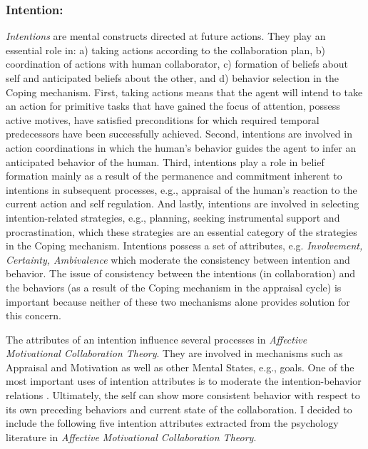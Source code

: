 \documentclass[letterpaper]{article}
\begin{document}
\subsubsection{Intention:}

\textit{Intentions} are mental constructs directed at future actions. They play
an essential role in: a) taking actions according to the collaboration plan, b)
coordination of actions with human collaborator, c) formation of beliefs about
self and anticipated beliefs about the other, and d) behavior selection in the
Coping mechanism. First, taking actions means that the agent will intend to take
an action for primitive tasks that have gained the focus of attention, possess
active motives, have satisfied preconditions for which required temporal
predecessors have been successfully achieved. Second, intentions are involved
in action coordinations in which the human's behavior guides the agent to infer
an anticipated behavior of the human. Third, intentions play a role in belief
formation mainly as a result of the permanence and commitment inherent to
intentions in subsequent processes, e.g., appraisal of the human's reaction to
the current action and self regulation. And lastly, intentions are involved in
selecting intention-related strategies, e.g., planning, seeking instrumental
support and procrastination, which these strategies are an essential category of
the strategies in the Coping mechanism. Intentions possess a set of attributes,
e.g. \textit{Involvement, Certainty, Ambivalence} which moderate the consistency
between intention and behavior. The issue of consistency between the intentions
(in collaboration) and the behaviors (as a result of the Coping mechanism in the
appraisal cycle) is important because neither of these two mechanisms alone
provides solution for this concern.

The attributes of an intention influence several processes in \textit{Affective
Motivational Collaboration Theory}. They are involved in mechanisms such as
Appraisal and Motivation as well as other Mental States, e.g., goals. One of the
most important uses of intention attributes is to moderate the
intention-behavior relations \cite{cooke:intention-behavior-consistency}.
Ultimately, the self can show more consistent behavior with respect to its own
preceding behaviors and current state of the collaboration. I decided to include
the following five intention attributes extracted from the psychology literature
in \textit{Affective Motivational Collaboration Theory}.
\end{document}
